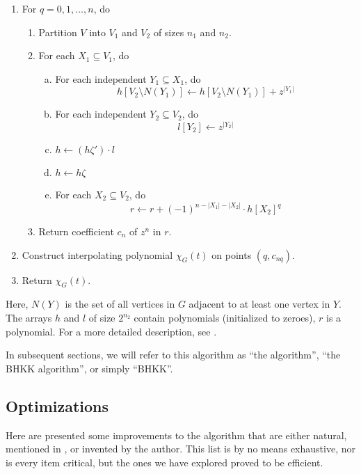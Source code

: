 \documentclass{cslthse-msc}
\begin{document}
\begin{enumerate}[{Step} A.]
\item \label{q} For $q = 0, 1, \ldots, n$, do
\begin{enumerate}[1.]
  \item Partition $V$ into $V_1$ and $V_2$ of sizes $n_1$ and $n_2$.
  \item \label{step1} For each $X_1 \subseteq V_1$, do
  \begin{enumerate}[a)]
  \item \label{indep1} For each independent $Y_1 \subseteq X_1$, do
\[ h[V_2 \setminus N(Y_1)] \leftarrow h[V_2 \setminus N(Y_1)] + z^{|Y_1|} \]
  \item \label{indep2} For each independent $Y_2 \subseteq V_2$, do
\[ l[Y_2] \leftarrow z^{|Y_2|} \]
  \item \label{multi} $h \leftarrow (h\zeta')\cdot l$
  \item $h \leftarrow h\zeta$
  \item \label{rstep}For each $X_2 \subseteq V_2$, do
\[ r \leftarrow r + (-1)^{n - |X_1| - |X_2|}\cdot h[X_2]^q \]
  \end{enumerate}
  \item Return coefficient $c_n$ of $z^n$ in $r$.
\end{enumerate}
\item Construct interpolating polynomial $\chi_G(t)$ on points $(q, c_{nq})$.
\item Return $\chi_G(t)$.
\end{enumerate}
Here, $N(Y)$ is the set of all vertices in $G$ adjacent to at least one vertex in $Y$. The arrays $h$ and $l$ of size $2^{n_2}$ contain polynomials (initialized to zeroes), $r$ is a polynomial. For a more detailed description, see \cite[p 9]{cov_pack}.

In subsequent sections, we will refer to this algorithm as ``the algorithm'', ``the BHKK algorithm'', or simply ``BHKK''.

\subsection{Optimizations}\label{optimizations}
Here are presented some improvements to the algorithm that are either natural, mentioned in \cite{cov_pack}, or invented by the author. This list is by no means exhaustive, nor is every item critical, but the ones we have explored proved to be efficient. 
\end{document}
